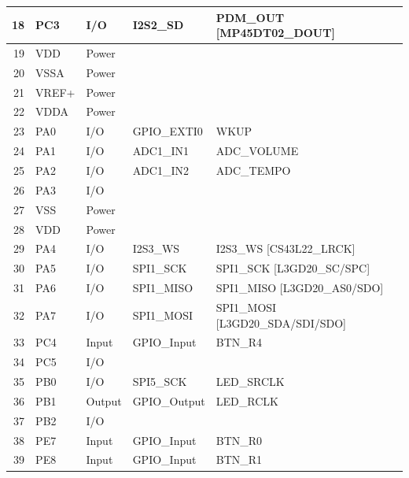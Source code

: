 \documentclass[12pt,a4paper]{report}
\begin{document}
\begin{longtable}[c]{|r|l|l|r|r|}
		\hline
		18    & PC3   & I/O   & \multicolumn{1}{l|}{I2S2\_SD} & \multicolumn{1}{l|}{PDM\_OUT [MP45DT02\_DOUT]} \\
		\hline
		19    & VDD   & Power &       &  \\
		\hline
		20    & VSSA  & Power &       &  \\
		\hline
		21    & VREF+ & Power &       &  \\
		\hline
		22    & VDDA  & Power &       &  \\
		\hline
		23    & PA0 & I/O   & \multicolumn{1}{l|}{GPIO\_EXTI0} & \multicolumn{1}{l|}{WKUP} \\
		\hline
		24    & PA1   & I/O   & \multicolumn{1}{l|}{ADC1\_IN1} & \multicolumn{1}{l|}{ADC\_VOLUME} \\
		\hline
		25    & PA2   & I/O   & \multicolumn{1}{l|}{ADC1\_IN2} & \multicolumn{1}{l|}{ADC\_TEMPO} \\
		\hline
		26    & PA3   & I/O   &       &  \\
		\hline
		27    & VSS   & Power &       &  \\
		\hline
		28    & VDD   & Power &       &  \\
		\hline
		29    & PA4   & I/O   & \multicolumn{1}{l|}{I2S3\_WS} & \multicolumn{1}{l|}{I2S3\_WS [CS43L22\_LRCK]} \\
		\hline
		30    & PA5   & I/O   & \multicolumn{1}{l|}{SPI1\_SCK} & \multicolumn{1}{l|}{SPI1\_SCK [L3GD20\_SC/SPC]} \\
		\hline
		31    & PA6   & I/O   & \multicolumn{1}{l|}{SPI1\_MISO} & \multicolumn{1}{l|}{SPI1\_MISO [L3GD20\_AS0/SDO]} \\
		\hline
		32    & PA7   & I/O   & \multicolumn{1}{l|}{SPI1\_MOSI} & \multicolumn{1}{l|}{SPI1\_MOSI [L3GD20\_SDA/SDI/SDO]} \\
		\hline
		33    & PC4   & Input & \multicolumn{1}{l|}{GPIO\_Input} & \multicolumn{1}{l|}{BTN\_R4} \\
		\hline
		34    & PC5   & I/O   &       &  \\
		\hline
		35    & PB0   & I/O   & \multicolumn{1}{l|}{SPI5\_SCK} & \multicolumn{1}{l|}{LED\_SRCLK} \\
		\hline
		36    & PB1   & Output & \multicolumn{1}{l|}{GPIO\_Output} & \multicolumn{1}{l|}{LED\_RCLK} \\
		\hline
		37    & PB2   & I/O   &       &  \\
		\hline
		38    & PE7   & Input & \multicolumn{1}{l|}{GPIO\_Input} & \multicolumn{1}{l|}{BTN\_R0} \\
		\hline
		39    & PE8   & Input & \multicolumn{1}{l|}{GPIO\_Input} & \multicolumn{1}{l|}{BTN\_R1} \\

\end{longtable}
\end{document}

